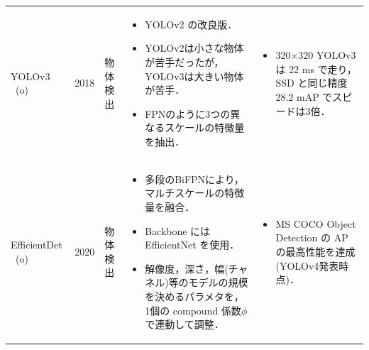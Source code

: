 \documentclass[twocolumn]{jsarticle} %
\newcommand{\bhline}[1]{\noalign{\hrule height #1}}
\begin{document}
\begin{table}
\begin{center}
\begin{tabularx}{\linewidth}{XcXp{7cm}X}
            YOLOv3 \cite{RedFar18} \ (o) & 2018 & 物体検出 & 
            \begin{itemize}
                \vspace{-0.7\baselineskip}
                \setlength{\leftskip}{-3mm}
                \item YOLOv2 の改良版．
                \item YOLOv2は小さな物体が苦手だったが，YOLOv3は大きい物体が苦手．
                \item FPNのように3つの異なるスケールの特徴量を抽出．
            \end{itemize}
            &
            \begin{itemize}
                \vspace{-0.7\baselineskip}
                \setlength{\leftskip}{-3mm}
                \item 320${\times}$320 YOLOv3 は 22 ms で走り，SSD\cite{LAESRFB16} と同じ精度 28.2 mAP でスピードは3倍．
            \end{itemize}
            \\

            EfficientDet \cite{TPL20} \ (o) & 2020 & 物体検出 & 
            \begin{itemize}
                \vspace{-0.7\baselineskip}
                \setlength{\leftskip}{-3mm}
                \item 多段のBiFPNにより，マルチスケールの特徴量を融合．
                \item Backbone には EfficientNet \cite{TanLe19}を使用．
                \item 解像度，深さ，幅(チャネル)等のモデルの規模を決めるパラメタを，1個の compound 係数$\phi$で連動して調整．
            \end{itemize}
            &
            \begin{itemize}
                \vspace{-0.7\baselineskip}
                \setlength{\leftskip}{-3mm}
                \item MS COCO Object Detection の AP の最高性能を達成(YOLOv4発表時点)．
            \end{itemize}
            \\


\end{tabularx}
\end{center}
\end{table}
\end{document}
